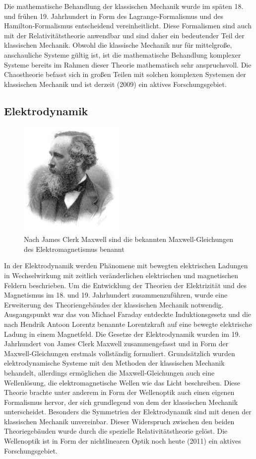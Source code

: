\documentclass[titlepage, parkskip=full, twocolumn, landscape]{scrartcl}
\begin{document}
Die mathematische Behandlung der klassischen Mechanik wurde im späten 18. und frühen 19. Jahrhundert in Form des Lagrange-Formalismus und des Hamilton-Formalismus entscheidend vereinheitlicht. Diese Formalismen sind auch mit der Relativitätstheorie anwendbar und sind daher ein bedeutender Teil der klassischen Mechanik. Obwohl die klassische Mechanik nur für mittelgroße, anschauliche Systeme gültig ist, ist die mathematische Behandlung komplexer Systeme bereits im Rahmen dieser Theorie mathematisch sehr anspruchsvoll. Die Chaostheorie befasst sich in großen Teilen mit solchen komplexen Systemen der klassischen Mechanik und ist derzeit (2009) ein aktives Forschungsgebiet.

\subsection{Elektrodynamik}

\begin{figure}
	\centering
	\includegraphics[width=5cm]{images/5.jpg}
	\caption{Nach James Clerk Maxwell sind die bekannten Maxwell-Gleichungen des Elektromagnetismus benannt}
\end{figure}

In der Elektrodynamik werden Phänomene mit bewegten elektrischen Ladungen in Wechselwirkung mit zeitlich veränderlichen elektrischen und magnetischen Feldern beschrieben. Um die Entwicklung der Theorien der Elektrizität und des Magnetismus im 18. und 19. Jahrhundert zusammenzuführen, wurde eine Erweiterung des Theoriengebäudes der klassischen Mechanik notwendig. Ausgangspunkt war das von Michael Faraday entdeckte Induktionsgesetz und die nach Hendrik Antoon Lorentz benannte Lorentzkraft auf eine bewegte elektrische Ladung in einem Magnetfeld. Die Gesetze der Elektrodynamik wurden im 19. Jahrhundert von James Clerk Maxwell zusammengefasst und in Form der Maxwell-Gleichungen erstmals vollständig formuliert. Grundsätzlich wurden elektrodynamische Systeme mit den Methoden der klassischen Mechanik behandelt, allerdings ermöglichen die Maxwell-Gleichungen auch eine Wellenlösung, die elektromagnetische Wellen wie das Licht beschreiben. Diese Theorie brachte unter anderem in Form der Wellenoptik auch einen eigenen Formalismus hervor, der sich grundlegend von dem der klassischen Mechanik unterscheidet. Besonders die Symmetrien der Elektrodynamik sind mit denen der klassischen Mechanik unvereinbar. Dieser Widerspruch zwischen den beiden Theoriegebäuden wurde durch die spezielle Relativitätstheorie gelöst. Die Wellenoptik ist in Form der nichtlinearen Optik noch heute (2011) ein aktives Forschungsgebiet.
\end{document}
